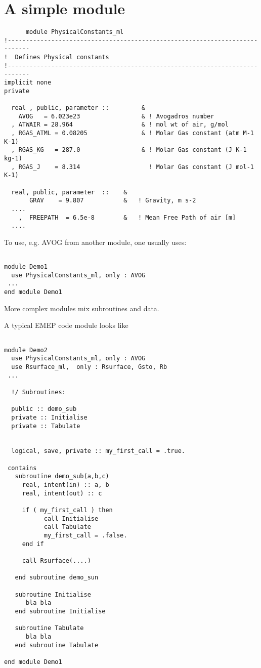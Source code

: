 \section*{A simple module}

\begin{verbatim}
      module PhysicalConstants_ml
!----------------------------------------------------------------------------
!  Defines Physical constants
!----------------------------------------------------------------------------
implicit none
private

  real , public, parameter ::         &
    AVOG   = 6.023e23                 & ! Avogadros number
  , ATWAIR = 28.964                   & ! mol wt of air, g/mol
  , RGAS_ATML = 0.08205               & ! Molar Gas constant (atm M-1 K-1)
  , RGAS_KG   = 287.0                 & ! Molar Gas constant (J K-1 kg-1)
  , RGAS_J    = 8.314                   ! Molar Gas constant (J mol-1 K-1)

  real, public, parameter  ::    &
       GRAV    = 9.807           &   ! Gravity, m s-2
  ....
    ,  FREEPATH  = 6.5e-8        &   ! Mean Free Path of air [m]
  ....

\end{verbatim}



To use, e.g.  AVOG from another module, one usually uses:

\begin{verbatim}

module Demo1
  use PhysicalConstants_ml, only : AVOG
 ...
end module Demo1

\end{verbatim}

More complex modules mix subroutines and data.


A typical EMEP code module looks like
\begin{verbatim}

module Demo2
  use PhysicalConstants_ml, only : AVOG
  use Rsurface_ml,  only : Rsurface, Gsto, Rb
 ...

  !/ Subroutines:

  public :: demo_sub
  private :: Initialise
  private :: Tabulate


  logical, save, private :: my_first_call = .true.

 contains
   subroutine demo_sub(a,b,c)
     real, intent(in) :: a, b
     real, intent(out) :: c

     if ( my_first_call ) then
           call Initialise
           call Tabulate
           my_first_call = .false.
     end if

     call Rsurface(....)

   end subroutine demo_sun

   subroutine Initialise
      bla bla 
   end subroutine Initialise

   subroutine Tabulate
      bla bla 
   end subroutine Tabulate

end module Demo1

\end{verbatim}
